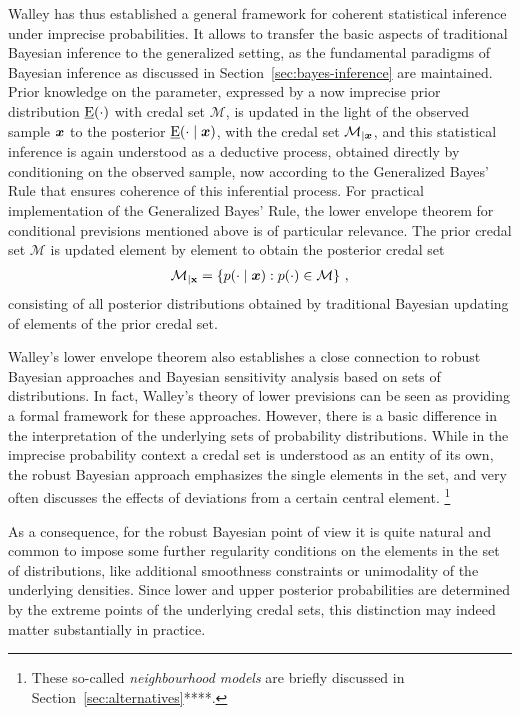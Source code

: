Walley has thus established a general framework for coherent statistical inference under imprecise probabilities.
It allows to transfer the basic aspects of traditional Bayesian inference to the generalized setting,
as the fundamental paradigms of Bayesian inference as discussed in Section~\ref{sec:bayes-inference} are maintained.
Prior knowledge on the parameter, expressed by a now imprecise prior distribution $\underline{\operatorname{E}}(\cdot)$ with credal set $\mathcal{M}$,
is updated in the light of the observed sample ${\bm x}$ to the posterior $\underline{\operatorname{E}}(\cdot \mid {\bm x})$,
with the credal set $\mathcal{M}_{\vert {\bm x}}$,
and this statistical inference is again understood as a deductive process,
obtained directly by conditioning on the observed sample,
now according to the Generalized Bayes' Rule that ensures coherence of this inferential process.
For practical implementation of the Generalized Bayes' Rule, the lower envelope theorem for conditional 
previsions mentioned above %
is of particular relevance.
The prior credal set $\mathcal{M}$ is updated element by element to obtain the posterior credal set %
\begin{align}
\label{eq:posteriorcredalset}
\mathcal{M}_{\vert \mathbf{x}} = \left\{ p(\cdot \mid {\bm x}) :  p(\cdot) \in \mathcal{M} \right\}\,,
\end{align}
consisting of all posterior distributions obtained
by traditional Bayesian updating of elements of the prior credal set.

Walley's lower envelope theorem also establishes a close connection to robust Bayesian approaches and Bayesian sensitivity analysis
\parencite[see, e.g.,][]{1994:berger, 2000:rios, 2005:ruggeri} based on sets of distributions.
In fact, Walley's theory of lower previsions can be seen as
providing a formal framework for these approaches.
However, there is a basic difference in the interpretation of the underlying sets of probability distributions.
While in the imprecise probability context a credal set is understood as an entity of its own,
the robust Bayesian approach emphasizes the single elements in the set,
and very often discusses the effects of deviations from a certain central element.%
\footnote{These so-called \emph{neighbourhood models} are briefly discussed in Section~\ref{sec:alternatives}****.}

As a consequence, for the robust Bayesian point of view it is quite natural and common
to impose some further regularity conditions on the elements in the set of distributions,
like additional smoothness constraints or unimodality of the underlying densities.
Since lower and upper posterior probabilities are determined by the extreme points of the underlying credal sets,
this distinction may indeed matter substantially in practice.

